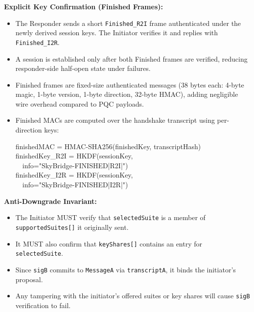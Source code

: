 \documentclass[10pt,journal,compsoc]{IEEEtran}
\providecommand{\tightlist}{%
	  \setlength{\itemsep}{0pt}\setlength{\parskip}{0pt}}
\begin{document}
\textbf{Explicit Key Confirmation (Finished Frames):}
\begin{itemize}\tightlist
\item
  The Responder sends a short \texttt{Finished\_R2I} frame authenticated
  under the newly derived session keys. The Initiator verifies it and
  replies with \texttt{Finished\_I2R}.
\item
  A session is established only after both Finished frames are
  verified, reducing responder-side half-open state under failures.
\item
  Finished frames are fixed-size authenticated messages (38 bytes each:
  4-byte magic, 1-byte version, 1-byte direction, 32-byte HMAC), adding
  negligible wire overhead compared to PQC payloads.
\item
  Finished MACs are computed over the handshake transcript using
  per-direction keys:
  {\raggedright\ttfamily\small\setlength{\parindent}{0pt}
  finishedMAC = HMAC-SHA256(finishedKey, transcriptHash)\\
  finishedKey\_R2I = HKDF(sessionKey,\\
  \ \ info="SkyBridge-FINISHED|R2I|")\\
  finishedKey\_I2R = HKDF(sessionKey,\\
  \ \ info="SkyBridge-FINISHED|I2R|")\par}
\end{itemize}

\textbf{Anti-Downgrade Invariant:}
\begin{itemize}\tightlist
\item
  The Initiator MUST verify that \texttt{selectedSuite} is a member of
  \texttt{supportedSuites[]} it originally sent.
\item
  It MUST also confirm that \texttt{keyShares[]} contains an entry
  for \texttt{selectedSuite}.
\item
  Since \texttt{sigB} commits to \texttt{MessageA} via
  \texttt{transcriptA}, it binds the initiator's proposal.
\item
  Any tampering with the initiator's offered suites or key shares will
  cause \texttt{sigB} verification to fail.
\end{itemize}
\end{document}
